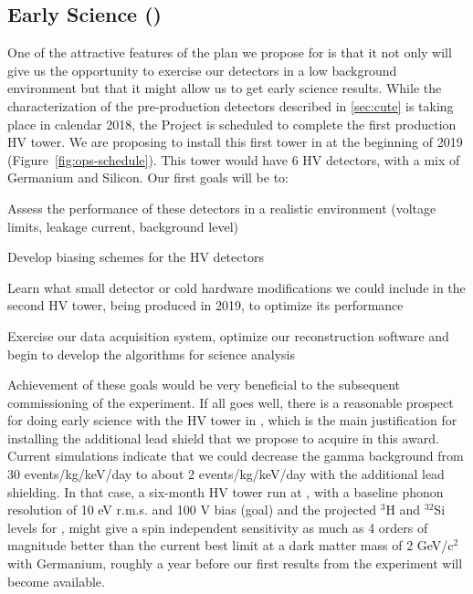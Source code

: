 \subsection{Early \scs Science ()}

One of the attractive features of the plan we propose for \cute is that it not only will give us the opportunity to exercise our detectors in a low background environment but that it might allow us to get early science results.
While the characterization of the pre-production detectors described in \ref{sec:cute} is taking place in calendar 2018, the \scs Project is scheduled to complete the first production HV tower.  We are proposing to install this first tower in \cute at the beginning of 2019 (Figure~\ref{fig:ops-schedule}). This tower would have 6 HV detectors, with a mix of Germanium and Silicon.  
Our first goals will be to:
\begin{compactitem}
\item  Assess the performance of these detectors in a realistic environment (voltage limits, leakage current, background level)
\item  Develop biasing schemes for the HV detectors
\item  Learn what small detector or cold hardware modifications we could include in the second HV tower, being produced in 2019, to optimize its performance
\item Exercise our data acquisition system, optimize our reconstruction software and begin to develop the algorithms for science analysis
\end{compactitem}

Achievement of these goals would be very beneficial to the subsequent commissioning of the \scs experiment. If all goes well, there is a reasonable prospect for doing early science with the HV tower in \cute, which is the main justification for  installing the additional lead shield that we propose to acquire in this award. Current simulations indicate that we could decrease the gamma background from 30 events/kg/keV/day to about 2 events/kg/keV/day with the additional lead shielding. In that case, a six-month HV tower run at \cute, with a baseline phonon resolution of 10 eV r.m.s. and 100 V bias (\scs goal) and the projected $^3$H and $^{32}$Si levels for \scs, might give a spin independent sensitivity as much as 4 orders of magnitude better than the current best limit \cite{2012EPJC...72.1971A} at a dark matter mass of 2 GeV/c$^2$ with Germanium, roughly a year before our first results from the \scs experiment will become available. 

